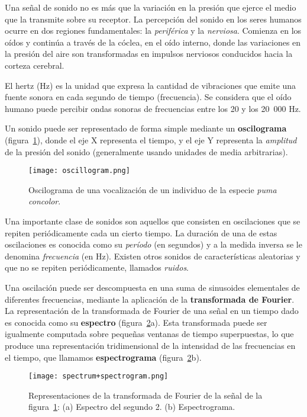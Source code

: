 Una señal de sonido no es más que la variación en la presión que ejerce el medio que la transmite sobre su receptor.
La percepción del sonido en los seres humanos ocurre en dos regiones fundamentales: la \textit{periférica} y la \textit{nerviosa}.
Comienza en los oídos y continúa a través de la cóclea, en el oído interno, donde las variaciones en la presión del aire son transformadas en impulsos nerviosos conducidos hacia la corteza cerebral.

El hertz (Hz) es la unidad que expresa la cantidad de vibraciones que emite una fuente sonora en cada segundo de tiempo (frecuencia).
Se considera que el oído humano puede percibir ondas sonoras de frecuencias entre los 20 y los 20~000 Hz.

Un sonido puede ser representado de forma simple mediante un \textbf{oscilograma} (figura~\ref{img:oscillogram}), donde el eje X representa el tiempo, y el eje Y representa la \textit{amplitud} de la presión del sonido (generalmente usando unidades de media arbitrarias).

\begin{figure}[!h]
    \centering
    \texttt{[image: oscillogram.png]}
    \caption{Oscilograma de una vocalización de un individuo de la especie \textit{puma concolor}.}
    \label{img:oscillogram}
\end{figure}

Una importante clase de sonidos son aquellos que consisten en oscilaciones que se repiten periódicamente cada un cierto tiempo.
La duración de una de estas oscilaciones es conocida como su \textit{período} (en segundos) y a la medida inversa se le denomina \textit{frecuencia} (en Hz).
Existen otros sonidos de características aleatorias y que no se repiten periódicamente, llamados \textit{ruidos}.

Una oscilación puede ser descompuesta en una suma de sinusoides elementales de diferentes frecuencias, mediante la aplicación de la \textbf{transformada de Fourier}.
La representación de la transformada de Fourier de una señal en un tiempo dado es conocida como su \textbf{espectro} (figura~\ref{img:spectrum+spectrogram}a).
Esta transformada puede ser igualmente computada sobre pequeñas ventanas de tiempo superpuestas, lo que produce una representación tridimensional de la intensidad de las frecuencias en el tiempo, que llamamos \textbf{espectrograma} (figura~\ref{img:spectrum+spectrogram}b).

\begin{figure}[!h]
    \centering
    \texttt{[image: spectrum+spectrogram.png]}
    \caption{Representaciones de la transformada de Fourier de la señal de la figura~\ref{img:oscillogram}: (a) Espectro del segundo 2. (b) Espectrograma.}
    \label{img:spectrum+spectrogram}
\end{figure}

